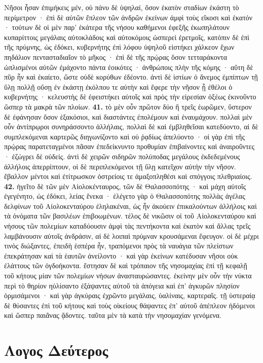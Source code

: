 \documentclass[a4paper, 11pt, oneside, polutonikogreek, german]{article}
\begin{document}
Νῆσοι ἦσαν ἐπιμήκεις μέν, οὐ πάνυ δὲ ὑψηλαί, ὅσον ἑκατὸν σταδίων ἑκάστη τὸ περίμετρον · ἐπὶ δὲ αὐτῶν ἔπλεον τῶν ἀνδρῶν ἐκείνων ἀμφὶ τοὺς εἴκοσι καὶ ἑκατόν · τούτων δὲ οἱ μὲν παρ' ἑκάτερα τῆς νήσου καθήμενοι ἐφεξῆς ἐκωπηλάτουν κυπαρίττοις μεγάλαις αὐτοκλάδοις καὶ αὐτοκόμοις ὡσπερεὶ ἐρετμοῖς, κατόπιν δὲ ἐπὶ τῆς πρύμνης, ὡς ἐδόκει, κυβερνήτης ἐπὶ λόφου ὑψηλοῦ εἱστήκει χάλκεον ἔχων πηδάλιον πεντασταδιαῖον τὸ μῆκος · ἐπὶ δὲ τῆς πρῴρας ὅσον τετταράκοντα ὡπλισμένοι αὐτῶν ἐμάχοντο πάντα ἐοικότες · ἀνθρώποις πλὴν τῆς κόμης · αὕτη δὲ πῦρ ἦν καὶ ἐκαίετο, ὥστε οὐδὲ κορύθων ἐδέοντο. ἀντὶ δὲ ἱστίων ὁ ἄνεμος ἐμπίπτων τῇ ὕλῃ πολλῇ οὔσῃ ἐν ἑκάστῃ ἐκόλπου τε αὐτὴν καὶ ἔφερε τὴν νῆσον ᾗ ἐθέλοι ὁ κυβερνήτης · κελευστὴς δὲ ἐφειστήκει αὐτοῖς καὶ πρὸς τὴν εἰρεσίαν ὀξέως ἐκινοῦντο ὥσπερ τὰ μακρὰ τῶν πλοίων. \textbf{41.} τὸ μὲν οὖν πρῶτον δύο ἢ τρεῖς ἑωρῶμεν, ὕστερον δὲ ἐφάνησαν ὅσον ἑξακόσιοι, καὶ διαστάντες ἐπολέμουν καὶ ἐναυμάχουν. πολλαὶ μὲν οὖν ἀντίπρῳροι συνηράσσοντο ἀλλήλαις, πολλαὶ δὲ καὶ ἐμβληθεῖσαι κατεδύοντο, αἱ δὲ συμπλεκόμεναι καρτερῶς διηγωνίζοντο καὶ οὐ ῥᾳδίως ἀπελύοντο · οἱ γὰρ ἐπὶ τῆς πρῴρας παρατεταγμένοι πᾶσαν ἐπεδείκνυντο προθυμίαν ἐπιβαίνοντες καὶ ἀναιροῦντες · ἐζώγρει δὲ οὐδείς. ἀντὶ δὲ χειρῶν σιδηρῶν πολύποδας μεγάλους ἐκδεδεμένους ἀλλήλοις ἀπερρίπτουν, οἱ δὲ περιπλεκόμενοι τῇ ὕλῃ κατεῖχον αὐτὴν τὴν νῆσον. ἔβαλλον μέντοι καὶ ἐτίτρωσκον ὀστρείοις τε ἁμαξοπληθέσι καὶ σπόγγοις πλεθριαίοις. \textbf{42.} ἡγεῖτο δὲ τῶν μὲν Αἰολοκένταυρος, τῶν δὲ Θαλασσοπότης · καὶ μάχη αὐτοῖς ἐγεγένητο, ὡς ἐδόκει, λείας ἕνεκα · ἐλέγετο γὰρ ὁ Θαλασσοπότης πολλὰς ἀγέλας δελφίνων τοῦ Αἰολοκενταύρου ἐληλακέναι, ὡς ἦν ἀκούειν ἐπικαλούντων ἀλλήλοις καὶ τὰ ὀνόματα τῶν βασιλέων ἐπιβοωμένων. τέλος δὲ νικῶσιν οἱ τοῦ Αἰολοκενταύρου καὶ νήσους τῶν πολεμίων καταδύουσιν ἀμφὶ τὰς πεντήκοντα καὶ ἑκατὸν καὶ ἄλλας τρεῖς λαμβάνουσιν αὐτοῖς ἀνδράσιν, αἱ δὲ λοιπαὶ πρύμναν κρουσάμεναι ἔφευγον. οἱ δὲ μέχρι τινὸς διώξαντες, ἐπειδὴ ἑσπέρα ἦν, τραπόμενοι πρὸς τὰ ναυάγια τῶν πλείστων ἐπεκράτησαν καὶ τὰ ἑαυτῶν ἀνείλοντο · καὶ γὰρ ἐκείνων κατέδυσαν νῆσοι οὐκ ἐλάττους τῶν ὀγδοήκοντα. ἔστησαν δὲ καὶ τρόπαιον τῆς νησομαχίας ἐπὶ τῇ κεφαλῇ τοῦ κήτους μίαν τῶν πολεμίων νήσων ἀνασταυρώσαντες. ἐκείνην μὲν οὖν τὴν νύκτα περὶ τὸ θηρίον ηὐλίσαντο ἐξάψαντες αὐτοῦ τὰ ἀπόγεια καὶ ἐπ' ἀγκυρῶν πλησίον ὁρμισάμενοι · καὶ γὰρ ἀγκύραις ἐχρῶντο μεγάλαις, ὑαλίναις, καρτεραῖς. τῇ ὑστεραίᾳ δὲ θύσαντες ἐπὶ τοῦ κήτους καὶ τοὺς οἰκείους θάψαντες ἐπ' αὐτοῦ ἀπέπλεον ἡδόμενοι καὶ ὥσπερ παιᾶνας ᾄδοντες. ταῦτα μὲν τὰ κατὰ τὴν νησομαχίαν γενόμενα.
\clearpage
\section{Λογος Δεύτερος}
\end{document}
